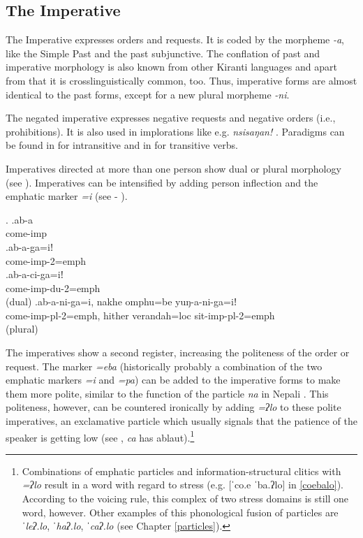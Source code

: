 \subsection{The Imperative}

The Imperative expresses orders and requests. It is coded by the morpheme \emph{-a}, like the Simple Past and the past subjunctive. The conflation of past and imperative morphology is also known from other Kiranti languages \citep{Bickel2003Belhare, Ebert2003Camling} and apart from that it is crosslinguistically common, too. Thus, imperative forms are almost identical to the past forms, except for a new plural morpheme \emph{-ni}. 

The negated imperative expresses negative requests and negative orders (i.e., prohibitions). It is also used in implorations like e.g. \emph{nsisaŋan!} . Paradigms can be found in  for intransitive and in  for transitive verbs.
 
Imperatives directed at more than one person show dual or plural morphology (see \Next).  Imperatives can be intensified by adding person inflection and the emphatic marker \emph{=i} (see \Next[b] - \Next[d]). 
 
 \ex. \ag.ab-a\\
 come{\sc -imp}\\
 \bg.ab-a-ga=iǃ\\
come{\sc -imp-2=emph}\\
 \bg.ab-a-ci-ga=iǃ\\
come{\sc -imp-du-2=emph}\\
  (dual)
 \bg.ab-a-ni-ga=i, nakhe omphu=be yuŋ-a-ni-ga=iǃ\\
come{\sc -imp-pl-2=emph}, hither verandah{\sc =loc} sit{\sc -imp-pl-2=emph}\\
  (plural)
 
The imperatives show a second register, increasing the  politeness of the order or request. The marker \emph{=eba} (historically probably a combination of the two  emphatic markers  \emph{=i} and \emph{=pa}) can be added to the imperative forms to make them more polite, similar to the function of the  particle \emph{na} in Nepali  \Next. This politeness, however, can be countered ironically by adding \emph{=ʔlo} to these polite imperatives, an exclamative particle which usually signals that  the patience of the speaker is getting low (see \Next[c], \emph{ca} has ablaut).\footnote{Combinations of emphatic particles and information-structural clitics with \emph{=ʔlo} result in a word with regard to stress (e.g. [ˈco.e ˈba.ʔlo] in \ref{coebalo}). According to the voicing rule,  this complex of two stress domains is still one word, however. Other examples of this phonological fusion of particles are \emph{ˈleʔ.lo}, \emph{ˈhaʔ.lo}, \emph{ˈcaʔ.lo} (see Chapter \ref{particles}).}

